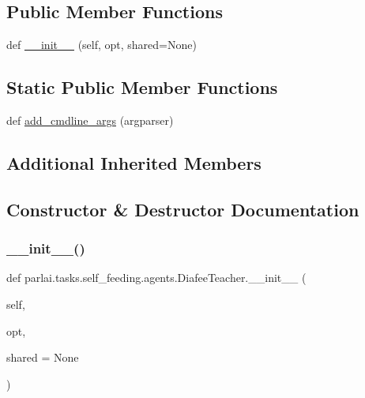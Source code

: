 \subsection*{Public Member Functions}
\begin{DoxyCompactItemize}
\item 
def \hyperlink{classparlai_1_1tasks_1_1self__feeding_1_1agents_1_1DiafeeTeacher_ab22b116d01e06c69aecafdad8b16ecb8}{\+\_\+\+\_\+init\+\_\+\+\_\+} (self, opt, shared=None)
\end{DoxyCompactItemize}
\subsection*{Static Public Member Functions}
\begin{DoxyCompactItemize}
\item 
def \hyperlink{classparlai_1_1tasks_1_1self__feeding_1_1agents_1_1DiafeeTeacher_aab781156a05d1046b153df4920d4ce6b}{add\+\_\+cmdline\+\_\+args} (argparser)
\end{DoxyCompactItemize}
\subsection*{Additional Inherited Members}


\subsection{Constructor \& Destructor Documentation}
\mbox{\label{classparlai_1_1tasks_1_1self__feeding_1_1agents_1_1DiafeeTeacher_ab22b116d01e06c69aecafdad8b16ecb8}} 
\subsubsection{\texorpdfstring{\+\_\+\+\_\+init\+\_\+\+\_\+()}{\_\_init\_\_()}}
{\footnotesize\ttfamily def parlai.\+tasks.\+self\+\_\+feeding.\+agents.\+Diafee\+Teacher.\+\_\+\+\_\+init\+\_\+\+\_\+ (\begin{DoxyParamCaption}\item[{}]{self,  }\item[{}]{opt,  }\item[{}]{shared = {\ttfamily None} }\end{DoxyParamCaption})}



